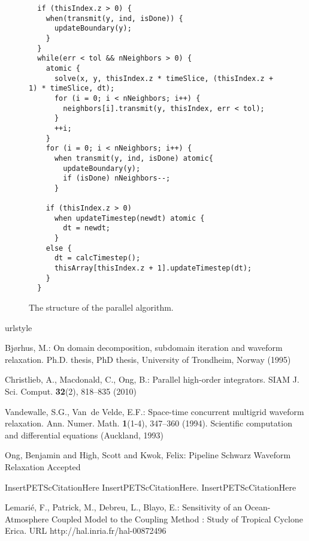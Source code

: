 \documentclass{svmult-ddm}
\begin{document}
\begin{figure}
\begin{verbatim}
  if (thisIndex.z > 0) {
    when(transmit(y, ind, isDone)) {
  	  updateBoundary(y);
    }
  }
  while(err < tol && nNeighbors > 0) {
    atomic {
      solve(x, y, thisIndex.z * timeSlice, (thisIndex.z + 1) * timeSlice, dt);
      for (i = 0; i < nNeighbors; i++) {
        neighbors[i].transmit(y, thisIndex, err < tol);
      }
      ++i;
    }
    for (i = 0; i < nNeighbors; i++) {
      when transmit(y, ind, isDone) atomic{
        updateBoundary(y);
        if (isDone) nNeighbors--;
      }
      
    if (thisIndex.z > 0)
      when updateTimestep(newdt) atomic {
      	dt = newdt;
      }
    else {
      dt = calcTimestep();
      thisArray[thisIndex.z + 1].updateTimestep(dt);
    }        
  }
\end{verbatim}
\label{fig:sdag}
\caption{The structure of the parallel algorithm.}
\end{figure}



\begin{thebibliography}{10}
\providecommand{\url}[1]{{#1}}
\providecommand{\urlprefix}{URL }
\expandafter\ifx\csname urlstyle\endcsname\relax
  \providecommand{\doi}[1]{DOI~\discretionary{}{}{}#1}\else
  \providecommand{\doi}{DOI~\discretionary{}{}{}\begingroup
  \urlstyle{rm}\Url}\fi

Bj{\o}rhus, M.: On domain decomposition, subdomain iteration and waveform
  relaxation.
\newblock Ph.D. thesis, PhD thesis, University of Trondheim, Norway (1995)

Christlieb, A., Macdonald, C., Ong, B.: Parallel high-order integrators.
\newblock SIAM J. Sci. Comput. \textbf{32}(2), 818--835 (2010)

Vandewalle, S.G., Van~de Velde, E.F.: Space-time concurrent multigrid waveform
  relaxation.
\newblock Ann. Numer. Math. \textbf{1}(1-4), 347--360 (1994).
\newblock Scientific computation and differential equations (Auckland, 1993)

Ong, Benjamin and High, Scott and Kwok, Felix: Pipeline Schwarz Waveform Relaxation
\newblock Accepted

InsertPETScCitationHere
\newblock InsertPETScCitationHere. InsertPETScCitationHere

Lemari{\'e}, F., Patrick, M., Debreu, L., Blayo, E.: {Sensitivity of an
  Ocean-Atmosphere Coupled Model to the Coupling Method : Study of Tropical
  Cyclone Erica}.
\newblock \urlprefix\url{http://hal.inria.fr/hal-00872496}


\end{thebibliography}
\end{document}
